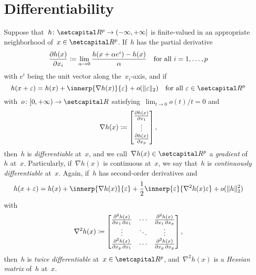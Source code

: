 \documentclass[../main]{subfiles}
\begin{document}
\section{Differentiability}
Suppose that~$h \colon \setR^p \to (-\infty, +\infty]$ is finite-valued in an appropriate neighborhood of~$x \in \setR^p$.
If~$h$ has the partial derivative
\begin{equation} \label{eq:pdv}
    \pdv{h(x)}{x_i} \coloneqq \lim_{\alpha \to 0} \frac{h(x + \alpha e^i) - h(x)}{\alpha} \quad \text{for all~$i = 1, \dots, p$}
\end{equation} 
with $e^i$ being the unit vector along the~$x_i$-axis, and if
\begin{equation} \label{eq:first_order_approximation}
    h(x + \varepsilon) = h(x) + \innerp{\nabla h(x)}{\varepsilon} + o(\norm{\varepsilon}_2) \forallcondition{\varepsilon \in \setR^p}
\end{equation} 
with~$o \colon [0, +\infty) \to \setR$ satisfying~$\lim_{t \to 0} o(t) / t = 0$ and
\begin{equation} \label{eq:grad}
    \nabla h(x) \coloneqq 
    \begin{bmatrix} 
        \pdv{h(x)}{x_1} \\ \vdots \\ \pdv{h(x)}{x_p} 
    \end{bmatrix}
,\end{equation} 
then~$h$ is \emph{differentiable} at~$x$, and we call~$\nabla h(x) \in \setR^p$ a \emph{gradient} of~$h$ at~$x$.
Particularly, if~$\nabla h(x)$ is continuous at~$x$, we say that~$h$ is \emph{continuously differentiable} at~$x$.
Again, if~$h$ has second-order derivatives and
\begin{equation}
    h(x + \varepsilon) = h(x) + \innerp{\nabla h(x)}{\varepsilon} + \frac{1}{2} \innerp{\varepsilon}{\nabla^2 h(x) \varepsilon} + o(\norm{h}_2^2)
\end{equation} 
with
\begin{equation} \label{eq:hess}
    \nabla^2 h(x) \coloneqq
    \begin{bmatrix} 
        \pdv{h(x)}{x_1,x_1} & \cdots & \pdv{h(x)}{x_1,x_p} \\
        \vdots & \ddots & \vdots \\
        \pdv{h(x)}{x_p,x_1} & \cdots & \pdv{h(x)}{x_p,x_p} \\
    \end{bmatrix} 
,\end{equation} 
then~$h$ is \emph{twice differentiable} at~$x \in \setR^p$, and~$\nabla^2 h(x)$ is a \emph{Hessian matrix} of~$h$ at~$x$.
\end{document}
